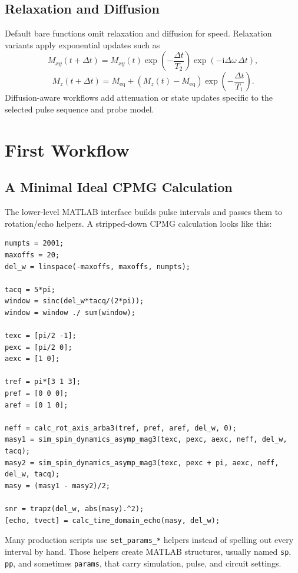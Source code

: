 \documentclass[11pt,oneside]{report}
\newcommand{\code}[1]{\texttt{#1}}
\newcommand{\ii}{\mathrm{i}}
\begin{document}
\section{Relaxation and Diffusion}

Default bare functions omit relaxation and diffusion for speed. Relaxation
variants apply exponential updates such as
\[
  M_{xy}(t+\Delta t) =
    M_{xy}(t)\exp\left(-\frac{\Delta t}{T_2}\right)
    \exp(-\ii \Delta\omega\,\Delta t),
\]
\[
  M_z(t+\Delta t) =
    M_{\mathrm{eq}} +
    \left(M_z(t)-M_{\mathrm{eq}}\right)
    \exp\left(-\frac{\Delta t}{T_1}\right).
\]
Diffusion-aware workflows add attenuation or state updates specific to the
selected pulse sequence and probe model.

\chapter{First Workflow}

\section{A Minimal Ideal CPMG Calculation}

The lower-level MATLAB interface builds pulse intervals and passes them to
rotation/echo helpers. A stripped-down CPMG calculation looks like this:

\begin{lstlisting}
numpts = 2001;
maxoffs = 20;
del_w = linspace(-maxoffs, maxoffs, numpts);

tacq = 5*pi;
window = sinc(del_w*tacq/(2*pi));
window = window ./ sum(window);

texc = [pi/2 -1];
pexc = [pi/2 0];
aexc = [1 0];

tref = pi*[3 1 3];
pref = [0 0 0];
aref = [0 1 0];

neff = calc_rot_axis_arba3(tref, pref, aref, del_w, 0);
masy1 = sim_spin_dynamics_asymp_mag3(texc, pexc, aexc, neff, del_w, tacq);
masy2 = sim_spin_dynamics_asymp_mag3(texc, pexc + pi, aexc, neff, del_w, tacq);
masy = (masy1 - masy2)/2;

snr = trapz(del_w, abs(masy).^2);
[echo, tvect] = calc_time_domain_echo(masy, del_w);
\end{lstlisting}

Many production scripts use \code{set\_params\_*} helpers instead of spelling
out every interval by hand. Those helpers create MATLAB structures, usually
named \code{sp}, \code{pp}, and sometimes \code{params}, that carry simulation,
pulse, and circuit settings.
\end{document}
